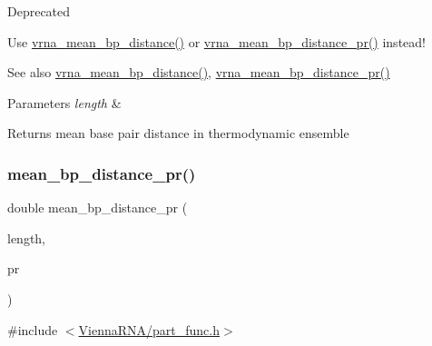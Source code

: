 \begin{DoxyRefDesc}{Deprecated}
\item[\hyperlink{deprecated__deprecated000109}{Deprecated}]Use \hyperlink{group__pf__fold_gaa6b8983b559b9ef4b2e1b31113ea317b}{vrna\+\_\+mean\+\_\+bp\+\_\+distance()} or \hyperlink{group__pf__fold_gad3f0c240512e6d43e2e4d4c2076021f5}{vrna\+\_\+mean\+\_\+bp\+\_\+distance\+\_\+pr()} instead! \end{DoxyRefDesc}
\begin{DoxySeeAlso}{See also}
\hyperlink{group__pf__fold_gaa6b8983b559b9ef4b2e1b31113ea317b}{vrna\+\_\+mean\+\_\+bp\+\_\+distance()}, \hyperlink{group__pf__fold_gad3f0c240512e6d43e2e4d4c2076021f5}{vrna\+\_\+mean\+\_\+bp\+\_\+distance\+\_\+pr()}
\end{DoxySeeAlso}

\begin{DoxyParams}{Parameters}
{\em length} & \\
\hline
\end{DoxyParams}
\begin{DoxyReturn}{Returns}
mean base pair distance in thermodynamic ensemble 
\end{DoxyReturn}
\mbox{\label{group__pf__fold_gad5ba36cef8d01cf4244cc09b9bf1ce1d}} 
\subsubsection{\texorpdfstring{mean\+\_\+bp\+\_\+distance\+\_\+pr()}{mean\_bp\_distance\_pr()}}
{\footnotesize\ttfamily double mean\+\_\+bp\+\_\+distance\+\_\+pr (\begin{DoxyParamCaption}\item[{int}]{length,  }\item[{\hyperlink{group__data__structures_ga31125aeace516926bf7f251f759b6126}{F\+L\+T\+\_\+\+O\+R\+\_\+\+D\+BL} $\ast$}]{pr }\end{DoxyParamCaption})}



{\ttfamily \#include $<$\hyperlink{part__func_8h}{Vienna\+R\+N\+A/part\+\_\+func.\+h}$>$}



